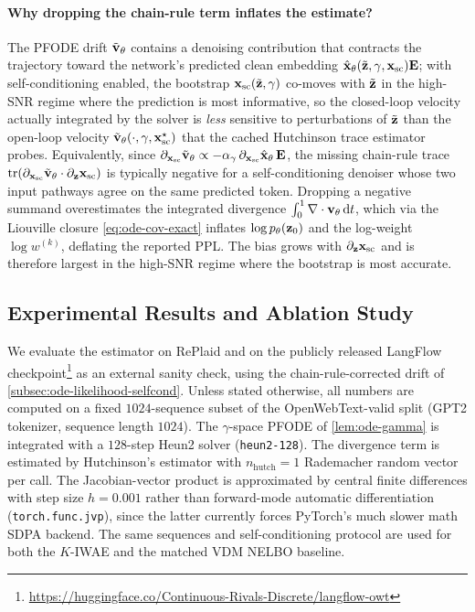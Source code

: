\documentclass{article}
\begin{document}
\paragraph{Why dropping the chain-rule term inflates the estimate?} The PFODE drift $\tilde{{\mathbf v}}_\theta$ contains a denoising contribution that contracts the trajectory toward the network's predicted clean embedding $\hat{{\mathbf x}}_\theta(\tilde{{\mathbf z}}, \gamma, {\mathbf x}_{\mathrm{sc}}){\mathbf E}$; with self-conditioning enabled, the bootstrap ${\mathbf x}_{\mathrm{sc}}(\tilde{{\mathbf z}}, \gamma)$ co-moves with $\tilde{{\mathbf z}}$ in the high-SNR regime where the prediction is most informative, so the closed-loop velocity actually integrated by the solver is \emph{less} sensitive to perturbations of $\tilde{{\mathbf z}}$ than the open-loop velocity $\tilde{{\mathbf v}}_\theta(\cdot, \gamma, {\mathbf x}_{\mathrm{sc}}^\star)$ that the cached Hutchinson trace estimator probes. Equivalently, since $\partial_{{\mathbf x}_{\mathrm{sc}}}\tilde{{\mathbf v}}_\theta \propto -\alpha_\gamma\,\partial_{{\mathbf x}_{\mathrm{sc}}}\hat{{\mathbf x}}_\theta\,{\mathbf E}$, the missing chain-rule trace $\operatorname{tr}(\partial_{{\mathbf x}_{\mathrm{sc}}}\tilde{{\mathbf v}}_\theta \cdot \partial_{\mathbf z}{\mathbf x}_{\mathrm{sc}})$ is typically negative for a self-conditioning denoiser whose two input pathways agree on the same predicted token. Dropping a negative summand overestimates the integrated divergence $\int_0^1 \nabla\cdot{\mathbf v}_\theta\,{\mathrm{d}} t$, which via the Liouville closure \cref{eq:ode-cov-exact} inflates $\log p_\theta({\mathbf z}_0)$ and the log-weight $\log w^{(k)}$, deflating the reported PPL. The bias grows with $\partial_{\mathbf z}{\mathbf x}_{\mathrm{sc}}$ and is therefore largest in the high-SNR regime where the bootstrap is most accurate.

\subsection{Experimental Results and Ablation Study}
\label{subsec:ode-likelihood-ablation}

We evaluate the estimator on RePlaid and on the publicly released LangFlow checkpoint\footnote{\url{https://huggingface.co/Continuous-Rivals-Discrete/langflow-owt}} as an external sanity check, using the chain-rule-corrected drift of \cref{subsec:ode-likelihood-selfcond}. Unless stated otherwise, all numbers are computed on a fixed $1024$-sequence subset of the OpenWebText-valid split (GPT2 tokenizer, sequence length $1024$). The $\gamma$-space PFODE of \cref{lem:ode-gamma} is integrated with a $128$-step Heun2 solver (\texttt{heun2-128}). The divergence term is estimated by Hutchinson's estimator with $n_\mathrm{hutch}=1$ Rademacher random vector per call. The Jacobian-vector product is approximated by central finite differences with step size $h=0.001$ rather than forward-mode automatic differentiation (\texttt{torch.func.jvp}), since the latter currently forces PyTorch's much slower math SDPA backend. The same sequences and self-conditioning protocol are used for both the $K$-IWAE and the matched VDM NELBO baseline.
\end{document}
